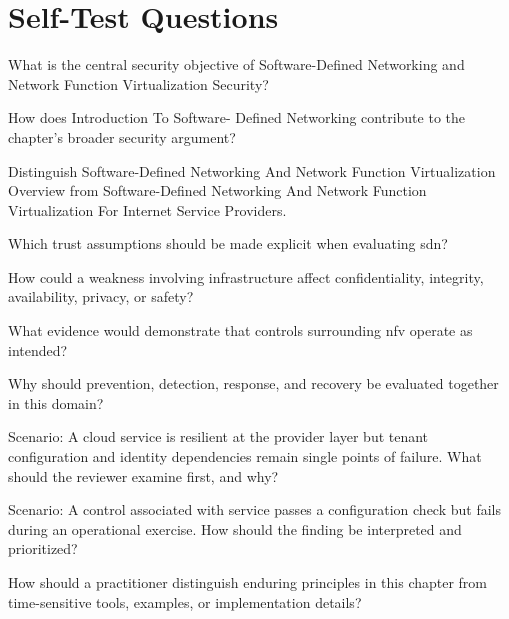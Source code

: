 \documentclass[11pt,letterpaper]{article}
\begin{document}
\section*{Self-Test Questions}
\begin{CornellRecallList}
\item What is the central security objective of Software-Defined Networking and Network Function Virtualization Security?
\item How does Introduction To Software- Defined Networking contribute to the chapter's broader security argument?
\item Distinguish Software-Defined Networking And Network Function Virtualization Overview from Software-Defined Networking And Network Function Virtualization For Internet Service Providers.
\item Which trust assumptions should be made explicit when evaluating sdn?
\item How could a weakness involving infrastructure affect confidentiality, integrity, availability, privacy, or safety?
\item What evidence would demonstrate that controls surrounding nfv operate as intended?
\item Why should prevention, detection, response, and recovery be evaluated together in this domain?
\item Scenario: A cloud service is resilient at the provider layer but tenant configuration and identity dependencies remain single points of failure. What should the reviewer examine first, and why?
\item Scenario: A control associated with service passes a configuration check but fails during an operational exercise. How should the finding be interpreted and prioritized?
\item How should a practitioner distinguish enduring principles in this chapter from time-sensitive tools, examples, or implementation details?
\end{CornellRecallList}
\end{document}

